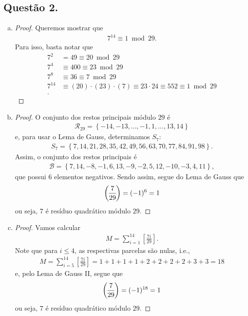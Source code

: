 \documentclass[a4paper,12pt]{article}
\newcommand{\genlegendre}[4]{%
	\genfrac{(}{)}{}{#1}{#3}{#4}%
	\if\relax\detokenize{#2}\relax\else_{\!#2}\fi
}
\newcommand{\legendre}[3][]{\genlegendre{}{#1}{#2}{#3}}
\theoremstyle{definition}
\begin{document}
	\subsection*{Questão 2.}
	\begin{enumerate}[(a)]
		\item \begin{proof}
			Queremos mostrar que
			\begin{align*}
			7^{14}\equiv 1\bmod 29.
			\end{align*}
			Para isso, basta notar que
			\begin{align*}
			7^2 &= 49 \equiv 20\bmod 29 \\
			7^4 &\equiv 400 \equiv 23\bmod 29 \\
			7^8 &\equiv 36 \equiv 7 \bmod 29 \\
			7^{14} &\equiv (20)\cdot(23)\cdot(7) \equiv 23\cdot 24 \equiv 552 \equiv 1 \bmod 29 \\.
			\end{align*}
		\end{proof}
	\item \begin{proof}
		O conjunto dos restos principais módulo $29$ é
		\begin{align*}
		\mathcal{R}_{29} = \left\{ -14, -13, \dots, -1,1,\dots, 13, 14 \right\}
		\end{align*}
		e, para usar o Lema de Gauss, determinamos $S_{7}:$
		\begin{align*}
		S_7 = \left\{ 7,14,21,28,35,42,49,56,63,70,77,84,91,98 \right\}.
		\end{align*}
		Assim, o conjunto dos restos principais é 
		\begin{align*}
		\mathcal{B} = \left\{ 7,14,-8,-1,6,13,-9,-2,5,12,-10,-3,4,11 \right\},
		\end{align*}
		que possui $6$ elementos negativos. Sendo assim, segue do Lema de Gauss que
		\begin{align*}
			\legendre[]{7}{29} = (-1)^6 = 1
		\end{align*}
		ou seja, $7$ é resíduo quadrático módulo $29$.
	\end{proof}
	\item \begin{proof}
		Vamos calcular 
		\begin{align*}
		M = \sum_{i=1}^{14}\left[ \frac{7i}{29} \right].
		\end{align*}
		Note que para $i\leq 4$, as respectivas parcelas são nulas, i.e.,
		\begin{align*}
		M = \sum_{i=5}^{14}\left[ \frac{7i}{29} \right] = 1+1+1+1+2+2+2+2+3+3 = 18
		\end{align*}
		e, pelo Lema de Gauss II, segue que
		\begin{align*}
		\legendre[]{7}{29} = (-1)^{18} = 1
		\end{align*}
		ou seja, $7$ é resíduo quadrático módulo $29$.
	\end{proof}
	\end{enumerate}
\end{document}
